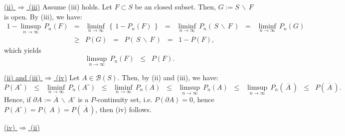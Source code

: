 \vskip 0.3cm
\noindent
\underline{(ii) $\Longrightarrow$ (iii)}
\vskip 0.2cm
\noindent
Assume (iii) holds. Let $F \subset S$ be an closed subset.
Then, $G := S\,\backslash\,F$ is open. By (iii), we have:
\begin{eqnarray*}
1 - \limsup_{n\rightarrow\infty}\,P_{n}\!\left(F\right)
&=& \liminf_{n\rightarrow\infty}\,\left\{\,1 - P_{n}\!\left(F\right)\,\right\}
\;\;=\;\;\liminf_{n\rightarrow\infty}\,P_{n}\!\left(\,S\,\backslash\,F\,\right)
\;\;=\;\;\liminf_{n\rightarrow\infty}\,P_{n}(G)
\\
&\geq& P\!\left(G\right)
\;\;=\;\; P\!\left(\,S\,\backslash\,F\,\right)
\;\;=\;\; 1 - P\!\left(F\right),
\end{eqnarray*}
which yields
\begin{equation}
\limsup_{n\rightarrow\infty}\,P_{n}\!\left(F\right)
\;\;\leq\;\; P\!\left(F\right).
\end{equation}

\vskip 0.3cm
\noindent
\underline{(ii) and (iii) $\Longrightarrow$ (iv)}
\vskip 0.2cm
\noindent
Let $A \in \mathcal{B}(S)$. Then, by (ii) and (iii), we have:
\begin{equation*}
P\!\left(A^{\circ}\right)
\;\;\leq\;\; \liminf_{n\rightarrow\infty}\,P_{n}\!\left(A^{\circ}\right)
\;\;\leq\;\; \liminf_{n\rightarrow\infty}\,P_{n}\!\left(A\right)
\;\;\leq\;\; \limsup_{n\rightarrow\infty}\,P_{n}\!\left(A\right)
\;\;\leq\;\; \limsup_{n\rightarrow\infty}\,P_{n}\!\left(\,\overline{A}\,\right)
\;\;\leq\;\; P\!\left(\,\overline{A}\,\right).
\end{equation*}
Hence, if $\partial A := \overline{A}\,\backslash\,A^{\circ}$ is a $P$-continuity set,
i.e. $P\!\left(\partial A\right) = 0$, hence
$P\!\left(A^{\circ}\right) = P\!\left(\,A\,\right) = P\!\left(\,\overline{A}\,\right)$, then (iv) follows.

\vskip 0.8cm
\noindent
\underline{(iv) $\Longrightarrow$ (ii)}
\vskip 0.2cm
\noindent

